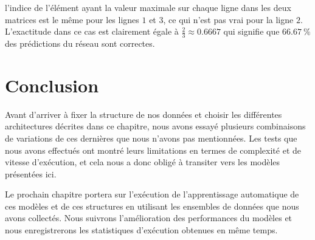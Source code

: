 \noindent l'indice de l'élément ayant la valeur maximale sur chaque ligne dans les deux
matrices est le même pour les lignes $1$ et $3$, ce qui n'est pas vrai pour la
ligne $2$. L'exactitude dans ce cas est clairement égale à $\frac{2}{3} \approx 0.6667$
qui signifie que $66.67~\%$ des prédictions du réseau sont correctes.

\section{Conclusion}

Avant d'arriver à fixer la structure de nos données et choisir les différentes
architectures décrites dans ce chapitre, nous avons essayé plusieurs combinaisons
de variations de ces dernières que nous n'avons pas mentionnées.
Les tests que nous avons effectués ont montré leurs limitations
en termes de complexité et de vitesse d'exécution, et cela nous a donc obligé à
transiter vers les modèles présentées ici.

Le prochain chapitre portera sur l'exécution de l'apprentissage automatique de
ces modèles et de ces structures en utilisant les ensembles de données que nous avons
collectés. Nous suivrons l'amélioration des performances du modèles et nous
enregistrerons les statistiques d'exécution obtenues en même temps.
